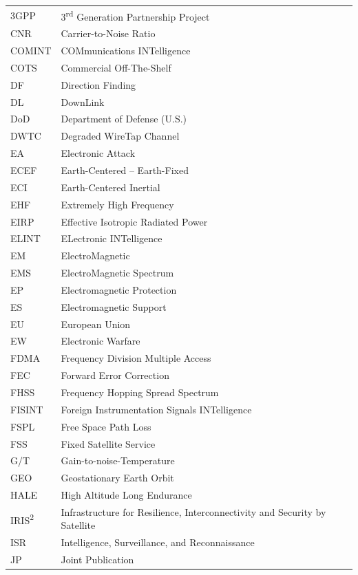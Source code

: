 \documentclass[english, 12pt, a4paper, elec, utf8, a-1b, online]{aaltothesis}
\begin{document}
\begin{tabular}{ll}
3GPP                    & 3\textsuperscript{rd} Generation Partnership Project \\
CNR                     & Carrier-to-Noise Ratio \\
COMINT                  & COMmunications INTelligence \\
COTS                    & Commercial Off-The-Shelf \\
DF                      & Direction Finding \\
DL                      & DownLink \\
DoD                     & Department of Defense (U.S.) \\
DWTC                    & Degraded WireTap Channel \\
EA                      & Electronic Attack \\
ECEF                    & Earth-Centered -- Earth-Fixed \\
ECI                     & Earth-Centered Inertial \\
EHF                     & Extremely High Frequency \\
EIRP                    & Effective Isotropic Radiated Power \\
ELINT                   & ELectronic INTelligence \\
EM                      & ElectroMagnetic \\
EMS                     & ElectroMagnetic Spectrum \\
EP                      & Electromagnetic Protection \\
ES                      & Electromagnetic Support \\
EU                      & European Union \\
EW                      & Electronic Warfare \\
FDMA                    & Frequency Division Multiple Access \\
FEC                     & Forward Error Correction \\
FHSS                    & Frequency Hopping Spread Spectrum \\
FISINT                  & Foreign Instrumentation Signals INTelligence \\
FSPL                    & Free Space Path Loss \\
FSS                     & Fixed Satellite Service \\
G/T                     & Gain-to-noise-Temperature \\
GEO                     & Geostationary Earth Orbit \\
HALE                    & High Altitude Long Endurance \\
IRIS\textsuperscript{2} & Infrastructure for Resilience, Interconnectivity and Security by Satellite \\
ISR                     & Intelligence, Surveillance, and Reconnaissance \\
JP                      & Joint Publication \\
\end{tabular}
\end{document}
